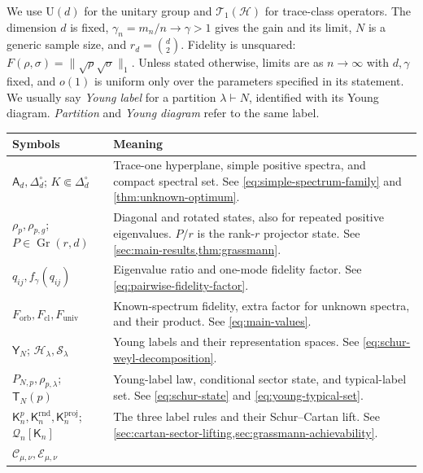 \documentclass[11pt]{article}
\theoremstyle{remark}
\theoremstyle{plain}
\newcommand{\cC}{\mathcal C}
\newcommand{\cE}{\mathcal E}
\newcommand{\cH}{\mathcal H}
\newcommand{\cS}{\mathcal S}
\newcommand{\cT}{\mathcal T}
\newcommand{\U}{\mathrm U}
\newcommand{\Gr}{\operatorname{Gr}}
\newcommand{\Forb}{F_{\mathrm{orb}}}
\newcommand{\Fcl}{F_{\mathrm{cl}}}
\newcommand{\Funiv}{F_{\mathrm{univ}}}
\begin{document}
We use \(\U(d)\) for the unitary group and \(\cT_1(\cH)\) for
trace-class operators.  The dimension \(d\) is fixed,
\(\gamma_n=m_n/n\to\gamma>1\) gives the gain and its limit, \(N\) is
a generic sample size, and \(r_d=\binom d2\).  Fidelity is unsquared:
\(F(\rho,\sigma)=\|\sqrt\rho\sqrt\sigma\|_1\).  Unless stated otherwise,
limits are as \(n\to\infty\) with \(d,\gamma\) fixed, and \(o(1)\) is
uniform only over the parameters specified in its statement.  We usually
say \emph{Young label} for a partition \(\lambda\vdash N\), identified with
its Young diagram. \emph{Partition} and \emph{Young diagram} refer to the
same label.

\begingroup
\small
\setlength{\LTpre}{6pt}
\setlength{\LTpost}{6pt}
\renewcommand{\arraystretch}{1.42}
\begin{longtable}{@{}>{\raggedright\arraybackslash}p{.28\linewidth}>{\raggedright\arraybackslash}p{}@{}}
\textbf{Symbols} & \textbf{Meaning} \\ \hline
\endhead
\(\mathsf A_d,\Delta_d^\circ\); \(K\Subset\Delta_d^\circ\)
& Trace-one hyperplane, simple positive spectra, and compact spectral set.
  See \eqref{eq:simple-spectrum-family} and
  \cref{thm:unknown-optimum}. \\[3pt]
\(\rho_p,\rho_{p,g}\); \(P\in\Gr(r,d)\)
& Diagonal and rotated states, also for repeated positive eigenvalues.
  \(P/r\) is the rank-\(r\) projector state.  See
  \cref{sec:main-results,thm:grassmann}. \\[3pt]
\(q_{ij},f_\gamma(q_{ij})\)
& Eigenvalue ratio and one-mode fidelity factor. See
  \eqref{eq:pairwise-fidelity-factor}. \\[3pt]
\(\Forb,\Fcl,\Funiv\)
& Known-spectrum fidelity, extra factor for unknown spectra, and their
  product. See
  \eqref{eq:main-values}. \\[3pt]
\(\mathsf Y_N\); \(\cH_\lambda,\cS_\lambda\)
& Young labels and their representation spaces. See
  \eqref{eq:schur-weyl-decomposition}. \\[3pt]
\(P_{N,p},\rho_{p,\lambda}\); \(\mathsf T_N(p)\)
& Young-label law, conditional sector state, and typical-label set. See
  \eqref{eq:schur-state} and \eqref{eq:young-typical-set}. \\[3pt]
\(\mathsf K_n^p,\mathsf K_n^{\mathrm{rnd}},\mathsf K_n^{\mathrm{proj}}\); \(\mathcal Q_n[\mathsf K_n]\)
& The three label rules and their Schur--Cartan lift. See
  \cref{sec:cartan-sector-lifting,sec:grassmann-achievability}. \\[3pt]
\(\cC_{\mu,\nu},\cE_{\mu,\nu}\)

\end{longtable}
\end{document}
